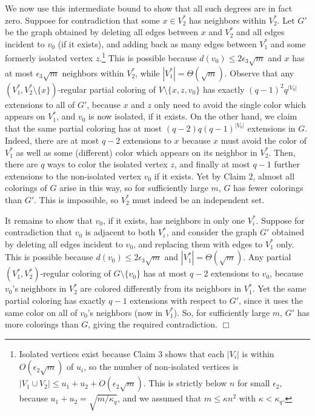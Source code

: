 \documentclass[11pt]{article}
\begin{document}
We now use this intermediate bound to show that all such degrees are
in fact zero.  Suppose for contradiction that some $x \in V_2^*$ has
neighbors within $V_2^*$.  Let $G'$ be the graph obtained by deleting
all edges between $x$ and $V_2^*$ and all edges incident to $v_0$ (if
it exists), and adding back as many edges between $V_1^*$ and some
formerly isolated vertex $z$.\footnote{Isolated vertices exist because
  Claim 3 shows that each $|V_i|$ is within $O(\epsilon_2 \sqrt{m})$
  of $u_i$, so the number of non-isolated vertices is $|V_1 \cup V_2|
  \leq u_1 + u_2 + O(\epsilon_2 \sqrt{m})$.  This is strictly below
  $n$ for small $\epsilon_2$, because $u_1 + u_2 = \sqrt{m/\kappa_q}$,
  and we assumed that $m \leq \kappa n^2$ with $\kappa < \kappa_q$.}
This is possible because $d(v_0) \leq 2\epsilon_3 \sqrt{m}$ and $x$
has at most $\epsilon_3 \sqrt{m}$ neighbors within $V_2^*$, while
$|V_1^*| = \Theta(\sqrt{m})$.  Observe that any $(V_1^*, V_2^*
\setminus \{x\})$-regular partial coloring of $V \setminus
\{x,z,v_0\}$ has exactly $(q-1)^2 q^{|V_0|}$ extensions to all of
$G'$, because $x$ and $z$ only need to avoid the single color which
appears on $V_1^*$, and $v_0$ is now isolated, if it exists.  On the
other hand, we claim that the same partial coloring has at most
$(q-2)q(q-1)^{|V_0|}$ extensions in $G$.  Indeed, there are at most
$q-2$ extensions to $x$ because $x$ must avoid the color of $V_1^*$ as
well as some (different) color which appears on its neighbor in
$V_2^*$.  Then, there are $q$ ways to color the isolated vertex $z$,
and finally at most $q-1$ further extensions to the non-isolated
vertex $v_0$ if it exists.  Yet by Claim 2, almost all colorings of
$G$ arise in this way, so for sufficiently large $m$, $G$ has fewer
colorings than $G'$.  This is impossible, so $V_2^*$ must indeed be an
independent set.


It remains to show that $v_0$, if it exists, has neighbors in only one
$V_i^*$.  Suppose for contradiction that $v_0$ is adjacent to both
$V_i^*$, and consider the graph $G'$ obtained by deleting all edges
incident to $v_0$, and replacing them with edges to $V_1^*$ only.
This is possible because $d(v_0) \leq 2\epsilon_3 \sqrt{m}$ and
$|V_1^*| = \Theta(\sqrt{m})$.  Any partial $(V_1^*, V_2^*)$-regular
coloring of $G \setminus \{v_0\}$ has at most $q-2$ extensions to
$v_0$, because $v_0$'s neighbors in $V_2^*$ are colored differently
from its neighbors in $V_1^*$.  Yet the same partial coloring has
exactly $q-1$ extensions with respect to $G'$, since it uses the same
color on all of $v_0$'s neighbors (now in $V_1^*$).  So, for
sufficiently large $m$, $G'$ has more colorings than $G$, giving the
required contradiction.  \hfill $\Box$
\end{document}
